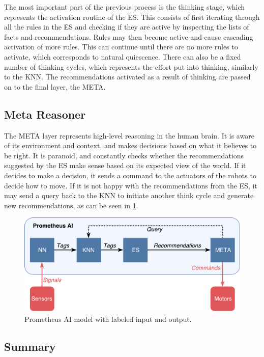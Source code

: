 \documentclass[titlepage,11pt]{article}
\begin{document}
The most important part of the previous process is the thinking stage, which represents the activation routine of the ES. This consists of first iterating through all the rules in the ES and checking if they are active by inspecting the lists of facts and recommendations. Rules may then become active and cause cascading activation of more rules. This can continue until there are no more rules to activate, which corresponds to natural quiescence. There can also be a fixed number of thinking cycles, which represents the effort put into thinking, similarly to the KNN. The recommendations activated as a result of thinking are passed on to the final layer, the META.

\subsection{Meta Reasoner}

The META layer represents high-level reasoning in the human brain. It is aware of its environment and context, and makes decisions based on what it believes to be right. It is paranoid, and constantly checks whether the recommendations suggested by the ES make sense based on its expected view of the world. If it decides to make a decision, it sends a command to the actuators of the robots to decide how to move. If it is not happy with the recommendations from the ES, it may send a query back to the KNN to initiate another think cycle and generate new recommendations, as can be seen in \cref{model_labeled}.

\begin{figure}[!htb]
	\includegraphics[width=\textwidth]{figures/ai_model_labeled.pdf}
	\caption{Prometheus AI model with labeled input and output.}
	\label{model_labeled}
\end{figure}

\subsection{Summary}
\end{document}
